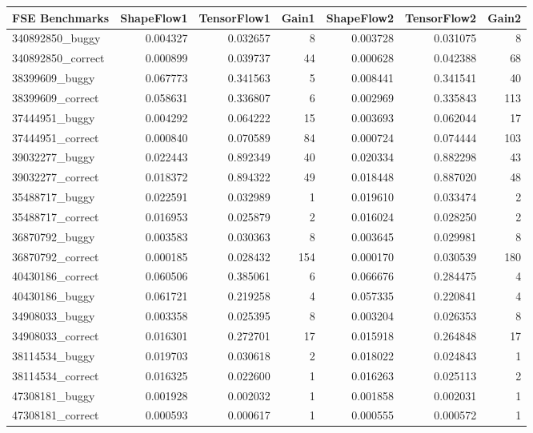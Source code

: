 \documentclass[12pt]{article}
\begin{document}
\begin{tabular}{lrrrrrr}
\toprule
FSE Benchmarks         &  ShapeFlow1 &  TensorFlow1 &  Gain1 &  ShapeFlow2 &  TensorFlow2 &  Gain2 \\
\midrule
 340892850\_buggy   &    0.004327 &     0.032657 &      8 &    0.003728 &     0.031075 &      8 \\
 340892850\_correct &    0.000899 &     0.039737 &     44 &    0.000628 &     0.042388 &     68 \\
 38399609\_buggy    &    0.067773 &     0.341563 &      5 &    0.008441 &     0.341541 &     40 \\
 38399609\_correct  &    0.058631 &     0.336807 &      6 &    0.002969 &     0.335843 &    113 \\
 37444951\_buggy    &    0.004292 &     0.064222 &     15 &    0.003693 &     0.062044 &     17 \\
 37444951\_correct  &    0.000840 &     0.070589 &     84 &    0.000724 &     0.074444 &    103 \\
 39032277\_buggy    &    0.022443 &     0.892349 &     40 &    0.020334 &     0.882298 &     43 \\
 39032277\_correct  &    0.018372 &     0.894322 &     49 &    0.018448 &     0.887020 &     48 \\
 35488717\_buggy    &    0.022591 &     0.032989 &      1 &    0.019610 &     0.033474 &      2 \\
 35488717\_correct  &    0.016953 &     0.025879 &      2 &    0.016024 &     0.028250 &      2 \\
 36870792\_buggy    &    0.003583 &     0.030363 &      8 &    0.003645 &     0.029981 &      8 \\
 36870792\_correct  &    0.000185 &     0.028432 &    154 &    0.000170 &     0.030539 &    180 \\
 40430186\_correct  &    0.060506 &     0.385061 &      6 &    0.066676 &     0.284475 &      4 \\
 40430186\_buggy    &    0.061721 &     0.219258 &      4 &    0.057335 &     0.220841 &      4 \\
 34908033\_buggy    &    0.003358 &     0.025395 &      8 &    0.003204 &     0.026353 &      8 \\
 34908033\_correct  &    0.016301 &     0.272701 &     17 &    0.015918 &     0.264848 &     17 \\
 38114534\_buggy    &    0.019703 &     0.030618 &      2 &    0.018022 &     0.024843 &      1 \\
 38114534\_correct  &    0.016325 &     0.022600 &      1 &    0.016263 &     0.025113 &      2 \\
 47308181\_buggy    &    0.001928 &     0.002032 &      1 &    0.001858 &     0.002031 &      1 \\
 47308181\_correct  &    0.000593 &     0.000617 &      1 &    0.000555 &     0.000572 &      1 \\
\bottomrule
\end{tabular}
\end{document}
